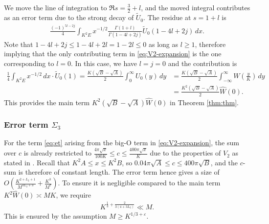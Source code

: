 \documentclass[reqno, 12pt]{amsart}
\renewcommand{\geq}{\geqslant}
\renewcommand{\leq}{\leqslant}
\begin{document}
We move the line of integration to ${\Re s =  } \frac{3}{2}+l$, and the {moved} integral contributes as an error term {due to the strong} decay of $\tilde{U}_0$. The residue at $s = 1+l$ is
\begin{align*}
  \frac{(-1)^{5l-2j}}{4} \int_{K^2 E} x^{-1/2} \frac{\Gamma(1+l)}{\Gamma(1-4l+2j)} \tilde{U}_0(1-4l+2j) \,dx.
\end{align*}
Note that $1-4l+2j \leq 1 - 4l + 2l = 1-2l \leq 0$ as long as $l \geq 1$, therefore implying that the only contributing term  in \eqref{eq:V2-expansion} is the one corresponding to $l = 0$. {In this case, we have $l=j=0$ and the contribution is
\begin{align*}
  \frac{1}{4} \int_{K^2 E} x^{-1/2} \,dx \cdot \tilde{U}_0(1) = \frac{K(\sqrt{B}-\sqrt{A})}{2} \int_0^\infty U_0(y) \,dy &= \frac{K(\sqrt{B}-\sqrt{A})}{2}\int_{-\infty}^\infty W \left( \frac{y}{K} \right) \,dy \\ &= \frac{K^2(\sqrt{B}-\sqrt{A})}{2}\hat{W}(0).
\end{align*}}
This provides the main term $K^2 (\sqrt{B} - \sqrt{A}) {\hat{W}}(0)$ in Theorem \ref{thm:thm}.

\subsubsection{Error term {$\Sigma_3$}}

For the term \eqref{eq:et} arising from the big-O term in \eqref{eq:V2-expansion}, the sum over $c$ is already restricted to $\frac{4\pi\sqrt{x}}{100K} \leq c \leq \frac{400\pi\sqrt{x}}{K}$ due to the {properties} of $V_2$ as stated in {\cite[Proposition~A.3]{li_bounds_2011}}.  Recall that $K^2 A \leq x \leq K^2B$, so
$0.04\pi \sqrt{A} \leq c \leq 400\pi \sqrt{B}$, and the $c$-sum is therefore of constant length. The  error term hence gives a size of $O( \frac{K^{2 + L_2 + 1}}{M^{3L_2+3}} + \frac{K^3}{M^7})$. To ensure it is negligible compared to the main term {$K^2\hat{W}(0) \asymp MK$}, we require
\begin{align*}
K^{\frac{1}{3} + \frac{2}{3(4+3L_2)}} \ll M.
\end{align*}
This is ensured by the assumption $M \geqslant K^{1/3+\varepsilon}$.
\end{document}

